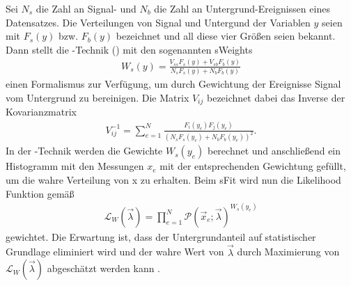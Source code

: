 Sei $N_s$ die Zahl an Signal- und $N_b$ die Zahl an Untergrund-Ereignissen eines Datensatzes. Die Verteilungen von Signal und Untergund der Variablen $y$ seien mit $F_s(y)$ bzw. $F_b(y)$ bezeichnet und all diese vier Größen seien bekannt. Dann stellt die \SPlot-Technik (\cite{splot}) mit den sogenannten \glqq sWeights\grqq 
\begin{align}
W_s(y) = \frac{V_{ss}F_s(y)+V_{sb}F_b(y)}{N_sF_s(y)+N_bF_b(y)}
\end{align} 
einen Formalismus zur Verfügung, um durch Gewichtung der Ereignisse Signal vom Untergrund zu bereinigen. Die Matrix $V_{ij}$ bezeichnet dabei das Inverse der Kovarianzmatrix
\begin{align}
V_{ij}^{-1} = \sum_{e=1}^N \frac{F_i(y_e)F_j(y_e)}{(N_sF_s(y_e)+N_bF_b(y_e))^2}.
\end{align}
In der \SPlot-Technik werden die Gewichte $W_s(y_e)$ berechnet und anschließend ein Histogramm mit den Messungen $x_e$ mit der entsprechenden Gewichtung gefüllt, um die wahre Verteilung von x zu erhalten. Beim sFit wird nun die Likelihood Funktion gemäß
\begin{align}
\mathcal{L}_W(\vec{\lambda}) = \prod_{e=1}^N \mathcal{P}(\vec{x}_e;\vec{\lambda})^{W_s(y_e)}
\end{align}
gewichtet. Die Erwartung ist, dass der Untergrundanteil auf statistischer Grundlage eliminiert wird und der wahre Wert von $\vec{\lambda}$ durch Maximierung von $\mathcal{L}_W(\vec{\lambda})$ abgeschätzt werden kann \cite{sfit}.

